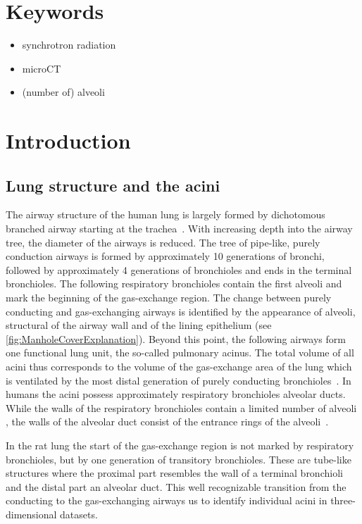 \documentclass[final,paper=a4,DIV=calc,abstract,english]{scrartcl}
\begin{document}
\section*{Keywords}
\begin{itemize}
	\item synchrotron radiation 
	\item microCT
	\item (number of) alveoli
\end{itemize}

\section{Introduction}
\subsection{Lung structure and the acini}
The airway structure of the human lung is largely formed by dichotomous branched airway starting at the trachea~\citep{Weibel1991}.
With increasing depth into the airway tree, the diameter of the airways is reduced.
The tree of pipe-like, purely conduction airways is formed by approximately 10 generations of bronchi, followed by approximately 4 generations of bronchioles and ends in the terminal bronchioles.
The following respiratory bronchioles contain the first alveoli and mark the beginning of the gas-exchange region.
The change between purely conducting and gas-exchanging airways is identified by the appearance of alveoli, structural  of the airway wall and of the lining epithelium (see \autoref{fig:ManholeCoverExplanation}).
Beyond this point, the following airways form one functional lung unit, the so-called pulmonary acinus.
The total volume of all acini thus corresponds to the volume of the gas-exchange area of the lung which is ventilated by the most distal generation of purely conducting bronchioles~\citep{Rodriguez1987}.
In humans the acini possess approximately  respiratory bronchioles  alveolar ducts.
While the walls of the respiratory bronchioles contain a limited number of alveoli , the walls of the alveolar duct  consist of the entrance rings of the alveoli~\citep{Schittny2007a}.

In the rat lung the start of the gas-exchange region is not marked by respiratory bronchioles, but by one generation of transitory bronchioles.
These are tube-like structures where the proximal part resembles the wall of a terminal bronchioli and the distal part an alveolar duct.
This well recognizable transition from the conducting to the gas-exchanging airways  us to identify individual acini in three-dimensional datasets.
\end{document}
